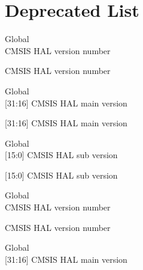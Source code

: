 \chapter{Deprecated List }
\hypertarget{deprecated}{}\label{deprecated}

\begin{DoxyRefList}
\item[Global \doxylink{_core_2_include_2core__armv81mml_8h_a43e1dc3e23f446a89cdf488b34fcc44d}{\+\_\+\+\_\+\+ARMv81\+MML\+\_\+\+CMSIS\+\_\+\+VERSION} ]\hfill \\
\label{deprecated__deprecated000003}%
%
CMSIS HAL version number 

\label{deprecated__deprecated000681}%
%
CMSIS HAL version number  
\item[Global \doxylink{_core_2_include_2core__armv81mml_8h_a822b00ede8572d38f1e8a58e61dfb5dc}{\+\_\+\+\_\+\+ARMv81\+MML\+\_\+\+CMSIS\+\_\+\+VERSION\+\_\+\+MAIN} ]\hfill \\
\label{deprecated__deprecated000001}%
%
\mbox{[}31\+:16\mbox{]} CMSIS HAL main version 

\label{deprecated__deprecated000679}%
%
\mbox{[}31\+:16\mbox{]} CMSIS HAL main version  
\item[Global \doxylink{_core_2_include_2core__armv81mml_8h_ab2bdf37bdd6a170d2951d9ffe29ad19e}{\+\_\+\+\_\+\+ARMv81\+MML\+\_\+\+CMSIS\+\_\+\+VERSION\+\_\+\+SUB} ]\hfill \\
\label{deprecated__deprecated000002}%
%
\mbox{[}15\+:0\mbox{]} CMSIS HAL sub version 

\label{deprecated__deprecated000680}%
%
\mbox{[}15\+:0\mbox{]} CMSIS HAL sub version  
\item[Global \doxylink{_core_2_include_2core__armv8mbl_8h_a27f9fea702a532f8aaead620abf2b354}{\+\_\+\+\_\+\+ARMv8\+MBL\+\_\+\+CMSIS\+\_\+\+VERSION} ]\hfill \\
\label{deprecated__deprecated000103}%
%
CMSIS HAL version number 

\label{deprecated__deprecated000781}%
%
CMSIS HAL version number  
\item[Global \doxylink{_core_2_include_2core__armv8mbl_8h_ad360c1ab5b1061b28437fa428c2442ad}{\+\_\+\+\_\+\+ARMv8\+MBL\+\_\+\+CMSIS\+\_\+\+VERSION\+\_\+\+MAIN} ]\hfill \\
\label{deprecated__deprecated000101}%
%
\mbox{[}31\+:16\mbox{]} CMSIS HAL main version 


\end{DoxyRefList}
